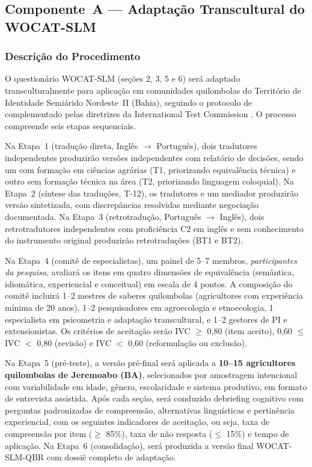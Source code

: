 \documentclass[12pt,a4paper,brazil]{article}
\begin{document}
\subsection{Componente~A --- Adaptação Transcultural do WOCAT-SLM}

\subsubsection{Descrição do Procedimento}

O questionário WOCAT-SLM (seções 2, 3, 5 e 6) será adaptado transculturalmente para aplicação em comunidades quilombolas do Território de Identidade Semiárido Nordeste~II (Bahia), seguindo o protocolo de \citet{Beaton2000} complementado pelas diretrizes da International Test Commission \citep{ITC2017}. O processo compreende seis etapas sequenciais.

Na Etapa~1 (tradução direta, Inglês $\rightarrow$ Português), dois tradutores independentes produzirão versões independentes com relatório de decisões, sendo um com formação em ciências agrárias (T1, priorizando equivalência técnica) e outro sem formação técnica na área (T2, priorizando linguagem coloquial). Na Etapa~2 (síntese das traduções, T-12), os tradutores e um mediador produzirão versão sintetizada, com discrepâncias resolvidas mediante negociação documentada. Na Etapa~3 (retrotradução, Português $\rightarrow$ Inglês), dois retrotradutores independentes com proficiência C2 em inglês e sem conhecimento do instrumento original produzirão retrotraduções (BT1 e BT2).

Na Etapa~4 (comitê de especialistas), um painel de 5--7 membros, \textit{participantes da pesquisa}, avaliará os itens em quatro dimensões de equivalência (semântica, idiomática, experiencial e conceitual) em escala de 4 pontos. A composição do comitê incluirá 1--2 mestres de saberes quilombolas (agricultores com experiência mínima de 20 anos), 1--2 pesquisadores em agroecologia e etnoecologia, 1 especialista em psicometria e adaptação transcultural, e 1--2 gestores de PI e extensionistas. Os critérios de aceitação serão IVC $\geq$ 0,80 (item aceito), 0,60 $\leq$ IVC $<$ 0,80 (revisão) e IVC $<$ 0,60 (reformulação ou exclusão).

Na Etapa~5 (pré-teste), a versão pré-final será aplicada a \textbf{10--15 agricultores quilombolas de Jeremoabo (BA)}, selecionados por amostragem intencional com variabilidade em idade, gênero, escolaridade e sistema produtivo, em formato de entrevista assistida. Após cada seção, será conduzido debriefing cognitivo com perguntas padronizadas de compreensão, alternativas linguísticas e pertinência experiencial, com os seguintes indicadores de aceitação, ou seja, taxa de compreensão por item ($\geq$ 85\%), taxa de não resposta ($\leq$ 15\%) e tempo de aplicação. Na Etapa~6 (consolidação), será produzida a versão final WOCAT-SLM-QBR com dossiê completo de adaptação.
\end{document}
